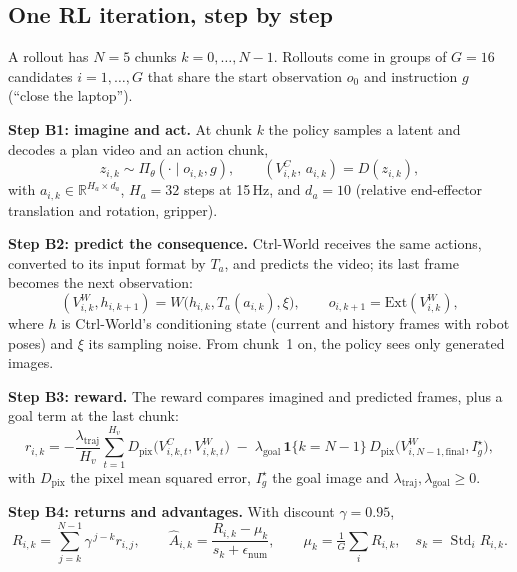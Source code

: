 \documentclass[11pt,a4paper]{article}
\theoremstyle{plain}
\theoremstyle{definition}
\theoremstyle{remark}
\newcommand{\VC}{V^{C}}
\newcommand{\VW}{V^{W}}
\newcommand{\R}{\mathbb R}
\DeclareMathOperator{\Std}{Std}
\begin{document}
\subsection{One RL iteration, step by step}
A rollout has $N=5$ chunks $k=0,\dots,N-1$. Rollouts come in groups of $G=16$ candidates $i=1,\dots,G$ that share the start observation $o_0$ and instruction $g$ (``close the laptop'').

\textbf{Step B1: imagine and act.} At chunk $k$ the policy samples a latent and decodes a plan video and an action chunk,
\begin{equation}
z_{i,k}\sim\Pi_\theta(\cdot\mid o_{i,k},g),\qquad (\VC_{i,k},\,a_{i,k})=D(z_{i,k}),
\end{equation}
with $a_{i,k}\in\R^{H_a\times d_a}$, $H_a=32$ steps at 15\,Hz, and $d_a=10$ (relative end-effector translation and rotation, gripper).

\textbf{Step B2: predict the consequence.} Ctrl-World receives the same actions, converted to its input format by $T_a$, and predicts the video; its last frame becomes the next observation:
\begin{equation}
(\VW_{i,k},h_{i,k+1})=W\big(h_{i,k},T_a(a_{i,k}),\xi\big),\qquad o_{i,k+1}=\mathrm{Ext}(\VW_{i,k}),
\end{equation}
where $h$ is Ctrl-World's conditioning state (current and history frames with robot poses) and $\xi$ its sampling noise. From chunk~1 on, the policy sees only generated images.

\textbf{Step B3: reward.} The reward compares imagined and predicted frames, plus a goal term at the last chunk:
\begin{equation}\label{eq:reward}
r_{i,k}=-\frac{\lambda_{\mathrm{traj}}}{H_v}\sum_{t=1}^{H_v}D_{\mathrm{pix}}\big(\VC_{i,k,t},\VW_{i,k,t}\big)\;-\;\lambda_{\mathrm{goal}}\,\mathbf 1\{k=N-1\}\,D_{\mathrm{pix}}\big(\VW_{i,N-1,\mathrm{final}},I^\star_g\big),
\end{equation}
with $D_{\mathrm{pix}}$ the pixel mean squared error, $I^\star_g$ the goal image and $\lambda_{\mathrm{traj}},\lambda_{\mathrm{goal}}\ge 0$.

\textbf{Step B4: returns and advantages.} With discount $\gamma=0.95$,
\begin{equation}\label{eq:adv}
R_{i,k}=\sum_{j=k}^{N-1}\gamma^{\,j-k}r_{i,j},\qquad
\hat A_{i,k}=\frac{R_{i,k}-\mu_k}{s_k+\epsilon_{\mathrm{num}}},\qquad
\mu_k=\tfrac1G\textstyle\sum_iR_{i,k},\quad s_k=\Std_i R_{i,k}.
\end{equation}
\end{document}
